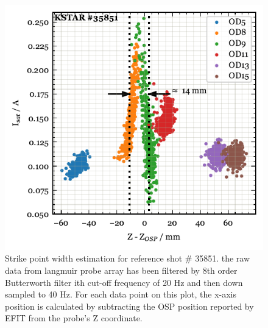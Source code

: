 \begin{figure}[!ht]
 \centering
 \includegraphics[width=\linewidth]{figures/StrikePointWidth.pdf}
 \caption{
Strike point width estimation for reference shot \# 35851.
the raw data from langmuir probe array has been filtered by 8th order Butterworth filter ith cut-off frequency of 20 Hz and then down sampled to 40 Hz.
For each data point on this plot, the x-axis position is calculated by subtracting the \ac{OSP} position reported by EFIT from the probe's Z coordinate.
}
 \label{fig:strike_point_width}
\end{figure}